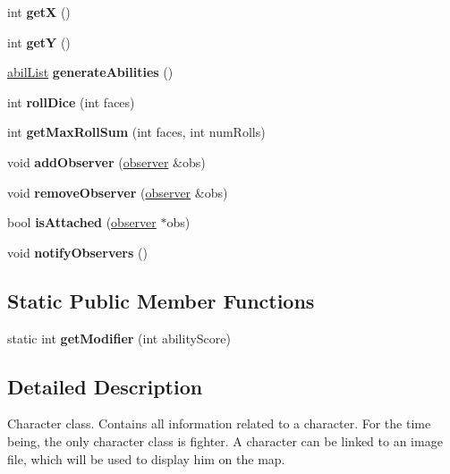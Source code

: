 \begin{DoxyCompactItemize}
int {\bfseries getX} ()
\item 
\hypertarget{classcharacter_a9ac85ca2d1a1930ef4ecf069997be39f}{}\label{classcharacter_a9ac85ca2d1a1930ef4ecf069997be39f} 
int {\bfseries getY} ()
\item 
\hypertarget{classcharacter_a14a67dba3fa314ce52f23966fa55bd22}{}\label{classcharacter_a14a67dba3fa314ce52f23966fa55bd22} 
\hyperlink{structcharacter_1_1abil_list}{abil\+List} {\bfseries generate\+Abilities} ()
\item 
\hypertarget{classcharacter_ae4482570a73550e4de68a5088e4166fa}{}\label{classcharacter_ae4482570a73550e4de68a5088e4166fa} 
int {\bfseries roll\+Dice} (int faces)
\item 
\hypertarget{classcharacter_a79782f747741ca665c4002969cccb1a1}{}\label{classcharacter_a79782f747741ca665c4002969cccb1a1} 
int {\bfseries get\+Max\+Roll\+Sum} (int faces, int num\+Rolls)
\item 
\hypertarget{classcharacter_a31b1482c77e8e8e81791ff6c6b83f334}{}\label{classcharacter_a31b1482c77e8e8e81791ff6c6b83f334} 
void {\bfseries add\+Observer} (\hyperlink{classobserver}{observer} \&obs)
\item 
\hypertarget{classcharacter_a8457474b31e7f3e8b3a3c48d5f564b96}{}\label{classcharacter_a8457474b31e7f3e8b3a3c48d5f564b96} 
void {\bfseries remove\+Observer} (\hyperlink{classobserver}{observer} \&obs)
\item 
\hypertarget{classcharacter_aaf06669f3ed8751518bad227f7a3cf11}{}\label{classcharacter_aaf06669f3ed8751518bad227f7a3cf11} 
bool {\bfseries is\+Attached} (\hyperlink{classobserver}{observer} $\ast$obs)
\item 
\hypertarget{classcharacter_ae514d5a8a08ac6437eb425d7d1ecd9d2}{}\label{classcharacter_ae514d5a8a08ac6437eb425d7d1ecd9d2} 
void {\bfseries notify\+Observers} ()
\end{DoxyCompactItemize}
\subsection*{Static Public Member Functions}
\begin{DoxyCompactItemize}
\item 
\hypertarget{classcharacter_a2551d2c84e185b12dabfdb4746af3519}{}\label{classcharacter_a2551d2c84e185b12dabfdb4746af3519} 
static int {\bfseries get\+Modifier} (int ability\+Score)
\end{DoxyCompactItemize}


\subsection{Detailed Description}
Character class. Contains all information related to a character. For the time being, the only character class is fighter. A character can be linked to an image file, which will be used to display him on the map.

